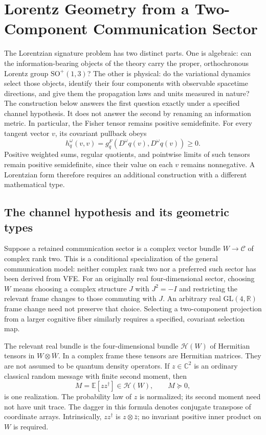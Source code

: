 \section{Lorentz Geometry from a Two-Component Communication Sector}
\label{sec:signature_resolution}

The Lorentzian signature problem has two distinct parts. One is algebraic: can the information-bearing objects of the theory carry the proper, orthochronous Lorentz group $\mathrm{SO}^{+}(1,3)$? The other is physical: do the variational dynamics select those objects, identify their four components with observable spacetime directions, and give them the propagation laws and units measured in nature? The construction below answers the first question exactly under a specified channel hypothesis. It does not answer the second by renaming an information metric. In particular, the Fisher tensor remains positive semidefinite. For every tangent vector $v$, its covariant pullback obeys
\begin{equation}
h_q^\omega(v,v)=g_q^F(D^\omega q(v),D^\omega q(v))\geq0.
\label{eq:lor-fisher-positive}
\end{equation}
Positive weighted sums, regular quotients, and pointwise limits of such tensors remain positive semidefinite, since their value on each $v$ remains nonnegative. A Lorentzian form therefore requires an additional construction with a different mathematical type.

\subsection{The channel hypothesis and its geometric types}

Suppose a retained communication sector is a complex vector bundle $W\to\mathcal C$ of complex rank two. This is a conditional specialization of the general communication model: neither complex rank two nor a preferred such sector has been derived from VFE. For an originally real four-dimensional sector, choosing $W$ means choosing a complex structure $J$ with $J^2=-I$ and restricting the relevant frame changes to those commuting with $J$. An arbitrary real $\mathrm{GL}(4,\mathbb R)$ frame change need not preserve that choice. Selecting a two-component projection from a larger cognitive fiber similarly requires a specified, covariant selection map.

The relevant real bundle is the four-dimensional bundle $\mathcal H(W)$ of Hermitian tensors in $W\otimes\overline W$. In a complex frame these tensors are Hermitian matrices. They are not assumed to be quantum density operators. If $z\in\mathbb C^2$ is an ordinary classical random message with finite second moment, then
\begin{equation}
M=\mathbb E[zz^\dagger]\in\mathcal H(W),\qquad M\succeq0,
\label{eq:lor-classical-moment}
\end{equation}
is one realization. The probability law of $z$ is normalized; its second moment need not have unit trace. The dagger in this formula denotes conjugate transpose of coordinate arrays. Intrinsically, $zz^\dagger$ is $z\otimes\bar z$; no invariant positive inner product on $W$ is required.

